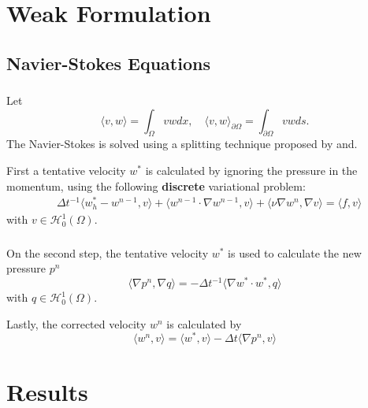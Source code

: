\documentclass{beamer}
\theoremstyle{definition}
\theoremstyle{remark}
\theoremstyle{example}
\newif\ifinsection
\newif\ifinsubsection
\let\oldsection\section
\renewcommand{\section}{
  \global\insectiontrue
  \global\insubsectionfalse
  \oldsection}
\let\oldsubsection\subsection
\renewcommand{\subsection}{
  \global\insubsectiontrue
  \oldsubsection}
\newcommand {\aframe}[1] {
  \begin{frame}
    \ifinsection\frametitle{\secname}\fi
    \ifinsubsection\framesubtitle{\subsecname}\fi
  #1
  \end{frame}
}
\begin{document}
\section{Weak Formulation}


\subsection{Navier-Stokes Equations}
\aframe{Let
  \begin{equation*}
    \langle v, w \rangle = \int_{\Omega} vw dx, \quad
    \langle v, w \rangle_{\partial \Omega} = \int_{\partial \Omega} vw ds.
  \end{equation*}
  The Navier-Stokes is solved using a splitting technique proposed
  by\textcite{chorin1968} and\textcite{temam1969}. \vspace{0.5cm} \pause

  First a tentative velocity $w^{*}$ is calculated by ignoring the pressure in
  the momentum, using the following \textbf{discrete} variational problem:
  \begin{align*}
    &\Delta t^{-1}\langle w^*_h-w^{n-1}, v\rangle +
      \langle w^{n-1}\cdot\nabla w^{n-1}, v\rangle +
      \langle\nu\nabla w^{n},\nabla v\rangle=\langle f,v\rangle
  \end{align*}
  with $v \in \mathcal{H}_{0}^{1}(\Omega)$. }

\aframe{On the second step, the tentative velocity $w^{*}$ is used to calculate
  the new pressure $p^{n}$
  \begin{equation*}
    \langle \nabla p^{n},\nabla q\rangle = -\Delta t^{-1}\langle\nabla
    w^*\cdot w^*, q\rangle
  \end{equation*}
  with $q \in \mathcal{H}_{0}^{1}(\Omega)$. \vspace{0.5cm} \pause

  Lastly, the corrected velocity $w^{n}$ is calculated by
  \begin{equation*}
    \langle w^{n}, v \rangle = \langle w^{*}, v \rangle - \Delta t
    \langle \nabla p^n, v \rangle
  \end{equation*}
}


\section{Results}
\end{document}
